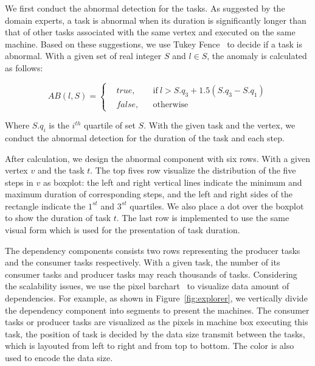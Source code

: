 We first conduct the abnormal detection for the tasks. As suggested by the domain experts, a task is abnormal when its duration is significantly longer than that of other tasks associated with the same vertex and executed on the same machine. Based on these suggestions, we use Tukey Fence~\cite{tukey1977exploratory} to decide if a task is abnormal. With a given set of real integer $S$ and $l \in S$, the anomaly is calculated as follows:

\begin{equation} 
AB(l, S) = \left \{
  \begin{aligned}
    &true, && \text{if}\ l > S.q_3+1.5(S.q_3-S.q_1)\\
    &false, && \text{otherwise}
  \end{aligned} \right.
\end{equation}

Where $S.q_i$ is the $i^{th}$ quartile of set $S$. With the given task and the vertex, we conduct the abnormal detection for the duration of the task and each step. 

After calculation, we design the abnormal component with six rows. With a given vertex $v$ and the task $t$. The top fives row visualize the distribution of the five steps in $v$ as boxplot: the left and right vertical lines indicate the minimum and maximum duration of corresponding steps, and the left and right sides of the rectangle indicate the $1^{st}$ and $3^{st}$ quartiles. We also place a dot over the boxplot to show the duration of task $t$. The last row is implemented to use the same visual form which is used for the presentation of task duration.

The dependency components consists two rows representing the producer tasks and the consumer tasks respectively. With a given task, the number of its consumer tasks and producer tasks may reach thousands of tasks. Considering the scalability issues, we use the pixel barchart~\cite{keim2002pixel} to visualize data amount of dependencies. For example, as shown in Figure~\ref{fig:explorer}, we vertically divide the dependency component into segments to present the machines. 
The consumer tasks or producer tasks are visualized as the pixels in machine box executing this task, the position of task is decided by the data size transmit between the tasks, which is layouted from left to right and from top to bottom. The color is also used to encode the data size. 




